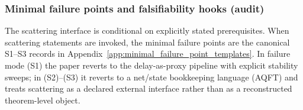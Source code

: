\subsubsection{Minimal failure points and falsifiability hooks (audit)}
\label{subsec:scattering_minimal_failure_points}
\AuditTag The scattering interface is conditional on explicitly stated prerequisites.
When scattering statements are invoked, the minimal failure points are the canonical S1--S3 records in Appendix~\ref{app:minimal_failure_point_templates}.
In failure mode (S1) the paper reverts to the delay-as-proxy pipeline with explicit stability sweeps; in (S2)--(S3) it reverts to a net/state bookkeeping language (AQFT) and treats scattering as a declared external interface rather than as a reconstructed theorem-level object.
